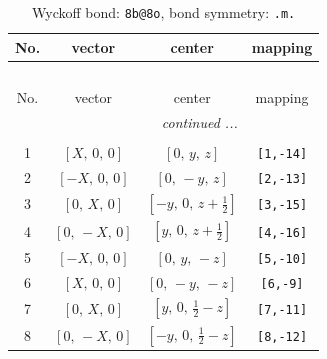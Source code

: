 \documentclass[fleqn,8pt]{jsarticle}
\begin{document}
\begin{longtable}{cccc}
\caption{Wyckoff bond: {\tt 8b@8o}, bond symmetry: {\tt .m.}}
 \\
 \hline \hline
No. & vector & center & mapping \\ \hline \endfirsthead

\multicolumn{3}{l}{\tablename\ \thetable{}} \\
 \hline \hline
No. & vector & center & mapping \\ \hline \endhead

 \hline \hline
\multicolumn{3}{r}{\footnotesize\it continued ...} \\ \endfoot

 \hline \hline
\multicolumn{3}{r}{} \\ \endlastfoot

1 & $\left[ X,\, 0,\, 0 \right]$ & $\left[ 0,\, y,\, z \right]$ & {\tt [1,-14]} \\ \hline
2 & $\left[ - X,\, 0,\, 0 \right]$ & $\left[ 0,\, - y,\, z \right]$ & {\tt [2,-13]} \\ \hline
3 & $\left[ 0,\, X,\, 0 \right]$ & $\left[ - y,\, 0,\, z + \frac{1}{2} \right]$ & {\tt [3,-15]} \\ \hline
4 & $\left[ 0,\, - X,\, 0 \right]$ & $\left[ y,\, 0,\, z + \frac{1}{2} \right]$ & {\tt [4,-16]} \\ \hline
5 & $\left[ - X,\, 0,\, 0 \right]$ & $\left[ 0,\, y,\, - z \right]$ & {\tt [5,-10]} \\ \hline
6 & $\left[ X,\, 0,\, 0 \right]$ & $\left[ 0,\, - y,\, - z \right]$ & {\tt [6,-9]} \\ \hline
7 & $\left[ 0,\, X,\, 0 \right]$ & $\left[ y,\, 0,\, \frac{1}{2} - z \right]$ & {\tt [7,-11]} \\ \hline
8 & $\left[ 0,\, - X,\, 0 \right]$ & $\left[ - y,\, 0,\, \frac{1}{2} - z \right]$ & {\tt [8,-12]} \\
\end{longtable}
\renewcommand{\arraystretch}{1.2}
\end{document}
